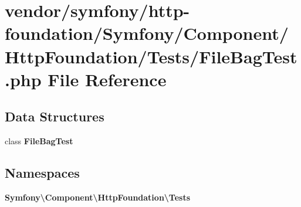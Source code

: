 \section{vendor/symfony/http-\/foundation/\+Symfony/\+Component/\+Http\+Foundation/\+Tests/\+File\+Bag\+Test.php File Reference}
\label{_file_bag_test_8php}
\subsection*{Data Structures}
\begin{DoxyCompactItemize}
\item 
class {\bf File\+Bag\+Test}
\end{DoxyCompactItemize}
\subsection*{Namespaces}
\begin{DoxyCompactItemize}
\item 
 {\bf Symfony\textbackslash{}\+Component\textbackslash{}\+Http\+Foundation\textbackslash{}\+Tests}
\end{DoxyCompactItemize}
